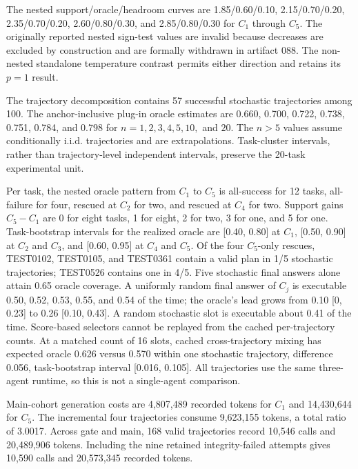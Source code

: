 The nested support/oracle/headroom curves are 1.85/0.60/0.10, 2.15/0.70/0.20, 2.35/0.70/0.20, 2.60/0.80/0.30, and 2.85/0.80/0.30 for \(C_1\) through \(C_5\). The originally reported nested sign-test values are invalid because decreases are excluded by construction and are formally withdrawn in artifact 088. The non-nested standalone temperature contrast permits either direction and retains its \(p=1\) result.

The trajectory decomposition contains 57 successful stochastic trajectories among 100. The anchor-inclusive plug-in oracle estimates are 0.660, 0.700, 0.722, 0.738, 0.751, 0.784, and 0.798 for \(n=1,2,3,4,5,10,\) and \(20\). The \(n>5\) values assume conditionally i.i.d. trajectories and are extrapolations. Task-cluster intervals, rather than trajectory-level independent intervals, preserve the 20-task experimental unit.

Per task, the nested oracle pattern from \(C_1\) to \(C_5\) is all-success for 12 tasks, all-failure for four, rescued at \(C_2\) for two, and rescued at \(C_4\) for two. Support gains \(C_5-C_1\) are 0 for eight tasks, 1 for eight, 2 for two, 3 for one, and 5 for one. Task-bootstrap intervals for the realized oracle are [0.40, 0.80] at \(C_1\), [0.50, 0.90] at \(C_2\) and \(C_3\), and [0.60, 0.95] at \(C_4\) and \(C_5\). Of the four \(C_5\)-only rescues, TEST0102, TEST0105, and TEST0361 contain a valid plan in 1/5 stochastic trajectories; TEST0526 contains one in 4/5. Five stochastic final answers alone attain 0.65 oracle coverage. A uniformly random final answer of \(C_j\) is executable 0.50, 0.52, 0.53, 0.55, and 0.54 of the time; the oracle's lead grows from 0.10 [0, 0.23] to 0.26 [0.10, 0.43]. A random stochastic slot is executable about 0.41 of the time. Score-based selectors cannot be replayed from the cached per-trajectory counts. At a matched count of 16 slots, cached cross-trajectory mixing has expected oracle 0.626 versus 0.570 within one stochastic trajectory, difference 0.056, task-bootstrap interval [0.016, 0.105]. All trajectories use the same three-agent runtime, so this is not a single-agent comparison.

Main-cohort generation costs are 4,807,489 recorded tokens for \(C_1\) and 14,430,644 for \(C_5\). The incremental four trajectories consume 9,623,155 tokens, a total ratio of 3.0017. Across gate and main, 168 valid trajectories record 10,546 calls and 20,489,906 tokens. Including the nine retained integrity-failed attempts gives 10,590 calls and 20,573,345 recorded tokens.

